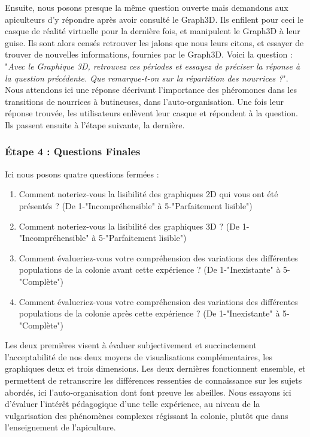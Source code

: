 			Ensuite, nous posons presque la même question ouverte mais demandons aux apiculteurs d'y répondre après avoir consulté le Graph3D. Ils enfilent pour ceci le casque de réalité virtuelle pour la dernière fois, et manipulent le Graph3D à leur guise. Ils sont alors censés retrouver les jalons que nous leurs citons, et essayer de trouver de nouvelles informations, fournies par le Graph3D. Voici la question : "\textit{Avec le Graphique 3D, retrouvez ces périodes et essayez de préciser la réponse à la question précédente. Que remarque-t-on sur la répartition des nourrices ?}". Nous attendons ici une réponse décrivant l'importance des phéromones dans les transitions de nourrices à butineuses, dans l'auto-organisation. Une fois leur réponse trouvée, les utilisateurs enlèvent leur casque et répondent à la question. Ils passent ensuite à l'étape suivante, la dernière.
			
			\subsubsection{Étape 4 : Questions Finales}
			Ici nous posons quatre questions fermées :
			\begin{enumerate}
				\item Comment noteriez-vous la lisibilité des graphiques 2D qui vous ont été présentés ? (De 1-"Incompréhensible" à 5-"Parfaitement lisible")
				\item Comment noteriez-vous la lisibilité des graphiques 3D ? (De 1-"Incompréhensible" à 5-"Parfaitement lisible")
				\item Comment évalueriez-vous votre compréhension des variations des différentes populations de la colonie avant cette expérience ? (De 1-"Inexistante" à 5-"Complète")
				\item Comment évalueriez-vous votre compréhension des variations des différentes populations de la colonie après cette expérience ? (De 1-"Inexistante" à 5-"Complète")
			\end{enumerate}
			
			Les deux premières visent à évaluer subjectivement et succinctement l'acceptabilité de nos deux moyens de visualisations complémentaires, les graphiques deux et trois dimensions.
			Les deux dernières fonctionnent ensemble, et permettent de retranscrire les différences ressenties de connaissance sur les sujets abordés, ici l'auto-organisation dont font preuve les abeilles. Nous essayons ici d'évaluer l'intérêt pédagogique d'une telle expérience, au niveau de la vulgarisation des phénomènes complexes régissant la colonie, plutôt que dans l'enseignement de l'apiculture.
		
